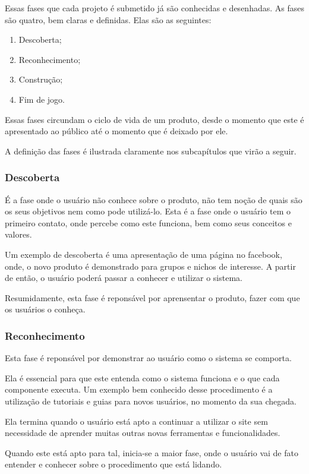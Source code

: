 Essas fases que cada projeto é submetido já são conhecidas e desenhadas. As fases
são quatro, bem claras e definidas. Elas são as seguintes:

\begin{enumerate}
    \item Descoberta;
    \item Reconhecimento;
    \item Construção;
    \item Fim de jogo.
\end{enumerate}

Essas fases circundam o ciclo de vida de um produto, desde o momento que este
é apresentado ao público até o momento que é deixado por ele.

A definição das fases é ilustrada claramente nos subcapítulos que virão a seguir.

\subsubsection{Descoberta}
\label{sub:descoperta}
É a fase onde o usuário não conhece sobre o produto, não tem noção de quais são
os
seus objetivos nem como pode utilizá-lo. Esta é a fase onde o usuário tem o primeiro
contato, onde percebe como este funciona, bem como seus conceitos e valores.

Um exemplo de descoberta é uma apresentação de uma página no facebook, onde,
o novo produto é demonstrado para grupos e nichos de interesse. A partir
de então, o usuário poderá passar a conhecer e utilizar o sistema.

Resumidamente, esta fase é reponsável por aprensentar o produto, fazer
com que os usuários o conheça.

\subsubsection{Reconhecimento}
\label{sub:reconhecimento}
Esta fase é reponsável por demonstrar ao usuário como o sistema se comporta.

Ela é essencial para que este entenda como o sistema funciona e o que cada
componente executa. Um exemplo bem conhecido desse procedimento é a utilização
de tutoriais e guias para novos usuários, no momento da sua chegada.

Ela termina quando o usuário está apto a continuar a utilizar o site sem
necessidade de aprender muitas outras novas ferramentas e funcionalidades.

Quando este está apto para tal, inicia-se a maior fase, onde o usuário
vai de fato entender e conhecer sobre o procedimento que está lidando.

